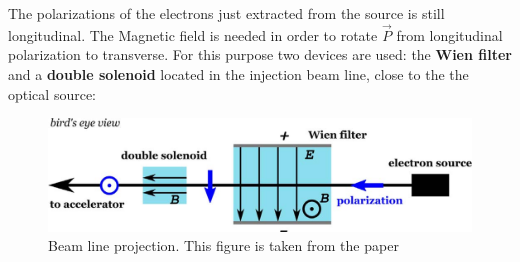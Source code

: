 The polarizations of the electrons just extracted from the source is still longitudinal. The Magnetic field is needed in order to rotate $\vec{P}$ from longitudinal polarization to transverse. For this purpose two devices are used: the \textbf{Wien filter} and a \textbf{double solenoid} located in the injection beam line, close to the the optical source: 

\begin{figure}[hbtp]
\centering
\includegraphics[width = \textwidth]{ExperimentalSetup/injection.png}
\caption{Beam line projection. This figure is taken from the paper \cite{Schlimme:2016rrp}}
\end{figure}

